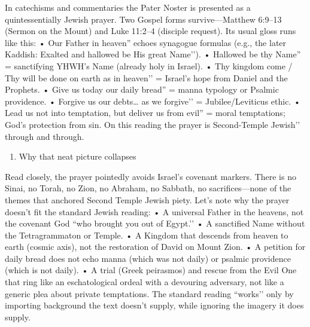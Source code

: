 In catechisms and commentaries the Pater Noster is presented as a quintessentially Jewish prayer.
Two Gospel forms survive—Matthew 6:9–13 (Sermon on the Mount) and Luke 11:2–4 (disciple request).
Its usual gloss runs like this: • Our Father in heaven'' echoes synagogue formulas (e.g., the later Kaddish: Exalted and hallowed be His great Name’’).
• Hallowed be thy Name'' = sanctifying YHWH's Name (already holy in Israel).
• Thy kingdom come / Thy will be done on earth as in heaven’’ = Israel’s hope from Daniel and the Prophets.
• Give us today our daily bread'' = manna typology or Psalmic providence.
• Forgive us our debts\ldots{} as we forgive’’ = Jubilee/Leviticus ethic.
• Lead us not into temptation, but deliver us from evil'' = moral temptations; God's protection from sin.
On this reading the prayer is Second-Temple Jewish’’ through and through.
\begin{enumerate}
    \def\labelenumi{\arabic{enumi})}
    \setcounter{enumi}{1}
    \item
    Why that neat picture collapses
\end{enumerate}
Read closely, the prayer pointedly avoids Israel’s covenant markers.
There is no Sinai, no Torah, no Zion, no Abraham, no Sabbath, no sacrifices—none of the themes that anchored Second Temple Jewish piety.
Let's note why the prayer doesn't fit the standard Jewish reading:
• A universal Father in the heavens, not the covenant God ``who brought you out of Egypt.’’
• A sanctified Name without the Tetragrammaton or Temple.
• A Kingdom that descends from heaven to earth (cosmic axis), not the restoration of David on Mount Zion.
• A petition for daily bread does not echo manna (which was not daily) or psalmic providence (which is not daily).
• A trial (Greek peirasmos) and rescue from the Evil One that ring like an eschatological ordeal with a devouring adversary, not like a generic plea about private temptations.
The standard reading ``works’’ only by importing background the text doesn’t supply, while ignoring the imagery it does supply.

